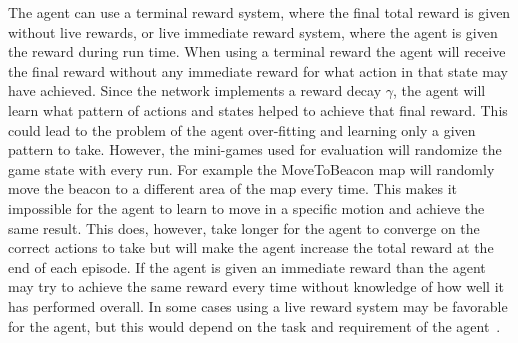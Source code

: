 The agent can use a terminal reward system, where the final total reward is
given without live rewards, or live immediate reward system, where the agent is
given the reward during run time. When using a terminal reward the agent will
receive the final reward without any immediate reward for what action in that
state may have achieved. Since the network implements a reward decay $\gamma$,
the agent will learn what pattern of actions and states helped to achieve that
final reward. This could lead to the problem of the agent over-fitting and
learning only a given pattern to take. However, the mini-games used for
evaluation will randomize the game state with every run. For example the
MoveToBeacon map will randomly move the beacon to a different area of the map
every time. This makes it impossible for the agent to learn to move in a
specific motion and achieve the same result. This does, however, take longer for
the agent to converge on the correct actions to take but will make the agent
increase the total reward at the end of each episode. If the agent is given an
immediate reward than the agent may try to achieve the same reward every time
without knowledge of how well it has performed overall. In some cases using a
live reward system may be favorable for the agent, but this would depend on the
task and requirement of the agent~\cite{shelton2001balancing}.
